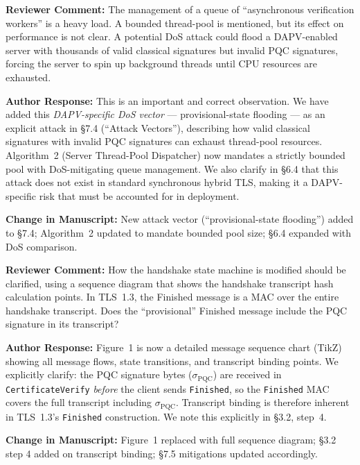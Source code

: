 \documentclass[12pt]{article}
\newcommand{\RC}[1]{\textcolor{reviewerblue}{\textbf{Reviewer Comment:}} #1}
\newcommand{\AR}[1]{\textcolor{replygreen}{\textbf{Author Response:}} #1}
\newcommand{\CH}[1]{\textcolor{changemagenta}{\textbf{Change in Manuscript:}} #1}
\begin{document}
\begin{reviewbox}
\RC{The management of a queue of ``asynchronous verification workers'' is a
heavy load.  A bounded thread-pool is mentioned, but its effect on performance
is not clear.  A potential DoS attack could flood a DAPV-enabled server with
thousands of valid classical signatures but invalid PQC signatures, forcing the
server to spin up background threads until CPU resources are exhausted.}
\end{reviewbox}

\begin{replybox}
\AR{This is an important and correct observation.  We have added this
\emph{DAPV-specific DoS vector} — provisional-state flooding — as an explicit
attack in \S7.4 (``Attack Vectors''), describing how valid classical signatures
with invalid PQC signatures can exhaust thread-pool resources.  Algorithm~2
(Server Thread-Pool Dispatcher) now mandates a strictly bounded pool with
DoS-mitigating queue management.  We also clarify in \S6.4 that this attack
does not exist in standard synchronous hybrid TLS, making it a DAPV-specific
risk that must be accounted for in deployment.}

\CH{New attack vector (``provisional-state flooding'') added to \S7.4;
Algorithm~2 updated to mandate bounded pool size; \S6.4 expanded with DoS
comparison.}
\end{replybox}

\begin{reviewbox}
\RC{How the handshake state machine is modified should be clarified, using a
sequence diagram that shows the handshake transcript hash calculation points.
In TLS~1.3, the Finished message is a MAC over the entire handshake transcript.
Does the ``provisional'' Finished message include the PQC signature in its
transcript?}
\end{reviewbox}

\begin{replybox}
\AR{Figure~1 is now a detailed message sequence chart (TikZ) showing all
message flows, state transitions, and transcript binding points.  We
explicitly clarify: the PQC signature bytes ($\sigma_{\text{PQC}}$) are
received in \texttt{CertificateVerify} \emph{before} the client sends
\texttt{Finished}, so the \texttt{Finished} MAC covers the full transcript
including $\sigma_{\text{PQC}}$.  Transcript binding is therefore inherent in
TLS~1.3's \texttt{Finished} construction.  We note this explicitly in
\S3.2, step~4.}

\CH{Figure~1 replaced with full sequence diagram; \S3.2 step 4 added on
transcript binding; \S7.5 mitigations updated accordingly.}
\end{replybox}
\end{document}
